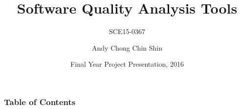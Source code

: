 \documentclass{beamer}
\title[SQAT]{Software Quality Analysis Tools}
\subtitle{SCE15-0367}
\author{Andy Chong Chin Shin}
\institute[SCSE]{School of Computer Science and Engineering}
\date[FYP, 2016]{Final Year Project Presentation, 2016}
\begin{document}
 
\frame{\titlepage}

\begin{frame}
\frametitle{Table of Contents}
\tableofcontents
\end{frame}
 

 
\end{document}
